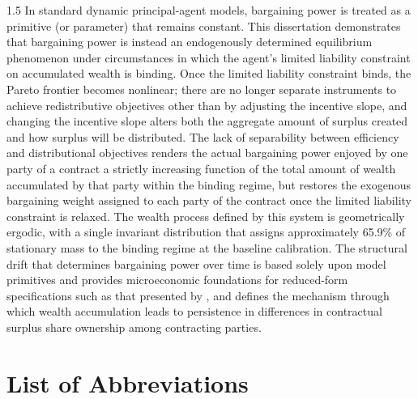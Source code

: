 \documentclass[12pt]{article}
\newcommand{\listofabbreviations}{\section*{List of Abbreviations}}
\theoremstyle{definition}
\theoremstyle{plain}
\begin{document}
\begin{spacing}{1.5}
In standard dynamic principal-agent models, bargaining power is treated as a primitive (or parameter) that remains constant. This dissertation demonstrates that bargaining power is instead an endogenously determined equilibrium phenomenon under circumstances in which the agent's limited liability constraint on accumulated wealth is binding. Once the limited liability constraint binds, the Pareto frontier becomes nonlinear; there are no longer separate instruments to achieve redistributive objectives other than by adjusting the incentive slope, and changing the incentive slope alters both the aggregate amount of surplus created and how surplus will be distributed. The lack of separability between efficiency and distributional objectives renders the actual bargaining power enjoyed by one party of a contract a strictly increasing function of the total amount of wealth accumulated by that party within the binding regime, but restores the exogenous bargaining weight assigned to each party of the contract once the limited liability constraint is relaxed. The wealth process defined by this system is geometrically ergodic, with a single invariant distribution that assigns approximately 65.9\% of stationary mass to the binding regime at the baseline calibration. The structural drift that determines bargaining power over time is based solely upon model primitives and provides microeconomic foundations for reduced-form specifications such as that presented by \textcite{digiannatale2025}, and defines the mechanism through which wealth accumulation leads to persistence in differences in contractual surplus share ownership among contracting parties.

\newpage

\listofabbreviations
\begin{acronym}[PMSE]
\end{acronym}

\newpage

\tableofcontents
\newpage

\begingroup
    \let\addcontentsline\relax
    \listoffigures
\endgroup

\begingroup
    \let\addcontentsline\relax
    \listoftables
\endgroup


\end{spacing}
\end{document}
